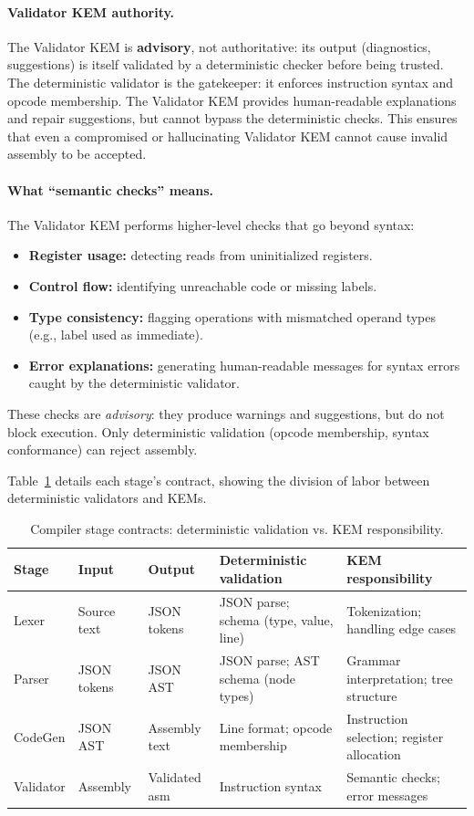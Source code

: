 \documentclass[11pt]{article}
\begin{document}
\paragraph{Validator KEM authority.}
The Validator KEM is \textbf{advisory}, not authoritative: its output (diagnostics, suggestions) is itself validated by a deterministic checker before being trusted.
The deterministic validator is the gatekeeper: it enforces instruction syntax and opcode membership.
The Validator KEM provides human-readable explanations and repair suggestions, but cannot bypass the deterministic checks.
This ensures that even a compromised or hallucinating Validator KEM cannot cause invalid assembly to be accepted.

\paragraph{What ``semantic checks'' means.}
The Validator KEM performs higher-level checks that go beyond syntax:
\begin{itemize}[leftmargin=*]
  \item \textbf{Register usage:} detecting reads from uninitialized registers.
  \item \textbf{Control flow:} identifying unreachable code or missing labels.
  \item \textbf{Type consistency:} flagging operations with mismatched operand types (e.g., label used as immediate).
  \item \textbf{Error explanations:} generating human-readable messages for syntax errors caught by the deterministic validator.
\end{itemize}
These checks are \emph{advisory}: they produce warnings and suggestions, but do not block execution. Only deterministic validation (opcode membership, syntax conformance) can reject assembly.

Table~\ref{tab:contracts} details each stage's contract, showing the division of labor between deterministic validators and KEMs.

\begin{table}[h]
\centering
\caption{Compiler stage contracts: deterministic validation vs. KEM responsibility.}
\label{tab:contracts}
\begin{tabular}{lp{2.2cm}p{2.2cm}p{3.0cm}p{3.5cm}}
\toprule
Stage & Input & Output & Deterministic validation & KEM responsibility \\
\midrule
Lexer & Source text & JSON tokens & JSON parse; schema (type, value, line) & Tokenization; handling edge cases \\
Parser & JSON tokens & JSON AST & JSON parse; AST schema (node types) & Grammar interpretation; tree structure \\
CodeGen & JSON AST & Assembly text & Line format; opcode membership & Instruction selection; register allocation \\
Validator & Assembly & Validated asm & Instruction syntax & Semantic checks; error messages \\
\bottomrule
\end{tabular}
\end{table}
\end{document}

